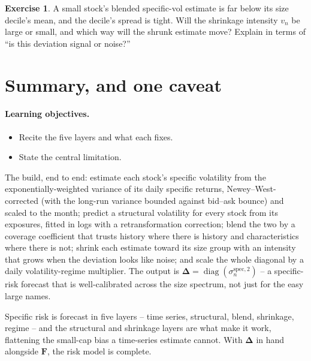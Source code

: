 \documentclass[11pt]{article}
\theoremstyle{definition}
\newtheorem{exercise}{Exercise}[section]
\theoremstyle{plain}
\theoremstyle{remark}
\DeclareMathOperator{\diag}{diag}
\newcommand{\Fmat}{\mathbf{F}}
\newcommand{\Del}{\boldsymbol{\Delta}}
\begin{document}
\begin{exercise}
A small stock's blended specific-vol estimate is far below its size decile's mean, and the decile's spread is tight. Will the shrinkage intensity $v_n$ be large or small, and which way will the shrunk estimate move? Explain in terms of ``is this deviation signal or noise?''
\end{exercise}

\section{Summary, and one caveat}\label{sec:summary}

\paragraph{Learning objectives.}
\begin{itemize}[leftmargin=1.4em,topsep=2pt]
  \item Recite the five layers and what each fixes.
  \item State the central limitation.
\end{itemize}

The build, end to end: estimate each stock's specific volatility from the exponentially-weighted variance of its daily specific returns, Newey--West-corrected (with the long-run variance bounded against bid--ask bounce) and scaled to the month; predict a structural volatility for every stock from its exposures, fitted in logs with a retransformation correction; blend the two by a coverage coefficient that trusts history where there is history and characteristics where there is not; shrink each estimate toward its size group with an intensity that grows when the deviation looks like noise; and scale the whole diagonal by a daily volatility-regime multiplier. The output is $\Del=\diag(\sigma^{\text{spec},2}_n)$ -- a specific-risk forecast that is well-calibrated across the size spectrum, not just for the easy large names.

\begin{keyresult}
Specific risk is forecast in five layers -- time series, structural, blend, shrinkage, regime -- and the structural and shrinkage layers are what make it work, flattening the small-cap bias a time-series estimate cannot. With $\Del$ in hand alongside $\Fmat$, the risk model is complete.
\end{keyresult}
\end{document}
